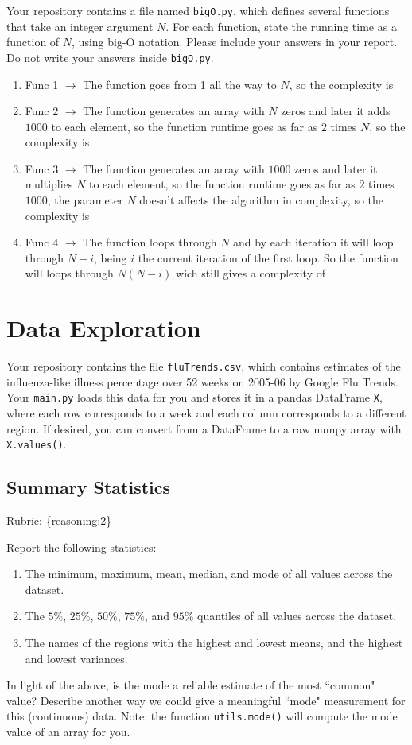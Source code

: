 \documentclass{article}
\def\rubric#1{\gre{Rubric: \{#1\}}}{}
\def\blu#1{{\color{blu}#1}}
\def\gre#1{{\color{gre}#1}}
\def\ans#1{{\color{ans}#1}}
\def\enum#1{\begin{enumerate}#1\end{enumerate}}
\begin{document}
Your repository contains a file named \texttt{bigO.py}, which defines several functions
that take an integer argument $N$. For each function, \blu{state the running time as a function of $N$, using big-O notation}.
Please include your answers in your report. Do not write your answers inside \texttt{bigO.py}.

\begin{enumerate}
\item Func 1 $\rightarrow$ \ans{The function goes from 1 all the way to $N$, so the complexity is }
\item Func 2 $\rightarrow$ \ans{The function generates an array with $N$ zeros and later it adds $1000$ to each element, so the function runtime goes as far as $2$ times $N$, so the complexity is \fbox{O($N$)}}
\item Func 3 $\rightarrow$ \ans{The function generates an array with $1000$ zeros and later it multiplies $N$ to each element, so the function runtime goes as far as $2$ times $1000$, the parameter $N$ doesn't affects the algorithm in complexity, so the complexity is \fbox{O($1$)}}
\item Func 4 $\rightarrow$ \ans{The function loops through $N$ and by each iteration it will loop through $N - i$, being $i$ the current iteration of the first loop. So the function will loops through $N(N-i)$ wich still gives a complexity of \fbox{O($N^2$)}}
\end{enumerate}

\section{Data Exploration}


Your repository contains the file \texttt{fluTrends.csv}, which contains estimates
of the influenza-like illness percentage over 52 weeks on 2005-06 by Google Flu Trends.
Your \texttt{main.py} loads this data for you and stores it in a pandas DataFrame \texttt{X},
where each row corresponds to a week and each column
corresponds to a different
region. If desired, you can convert from a DataFrame to a raw numpy array with \texttt{X.values()}.

\subsection{Summary Statistics}
\rubric{reasoning:2}

\blu{Report the following statistics}:
\enum{
\item The minimum, maximum, mean, median, and mode of all values across the dataset.
\item The $5\%$, $25\%$, $50\%$, $75\%$, and $95\%$ quantiles of all values across the dataset.
\item The names of the regions with the highest and lowest means, and the highest and lowest variances.
}
In light of the above, \blu{is the mode a reliable estimate of the most ``common" value? Describe another way we could give a meaningful ``mode" measurement for this (continuous) data.} Note: the function \texttt{utils.mode()} will compute the mode value of an array for you.
\end{document}
